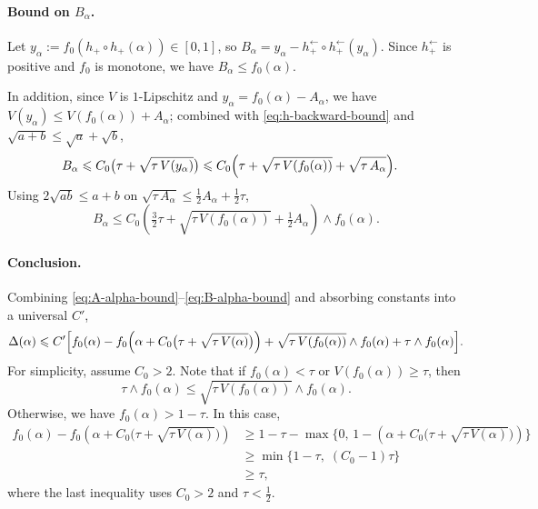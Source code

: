\documentclass[english]{article}
\theoremstyle{plain}
\theoremstyle{definition}
\newcommand{\hinv}{h_+^{\leftarrow}}
\newcommand{\hupup}{h_+\mathbin{\circ}h_+}                 %
\newcommand{\hinvinv}{h_+^{\leftarrow}\mathbin{\circ}h_+^{\leftarrow}}  %
\newcommand{\mgn}[1]{\tau+\sqrt{\tau\,V(#1)}}
\newcommand{\fnull}{f_0}
\begin{document}
\paragraph{Bound on $B_\alpha$.} Let $y_\alpha:=\fnull(\hupup(\alpha))\in[0,1]$, so $B_\alpha=y_\alpha-\hinvinv(y_\alpha)$. 
Since $\hinv$ is positive and $\fnull$ is monotone, we have $B_\alpha \leqslant \fnull(\alpha)$.

In addition, since $V$ is $1$-Lipschitz and $y_\alpha=\fnull(\alpha)-A_\alpha$, we have $V(y_\alpha)\leqslant V(\fnull(\alpha))+A_\alpha$; combined with \eqref{eq:h-backward-bound} and $\sqrt{a+b}\leqslant\sqrt a+\sqrt b$,
\begin{align*}
B_\alpha
&\leqslant C_0\bigl(\mgn{y_\alpha}\bigr)
\leqslant C_0\Bigl(\tau+\sqrt{\tau\,V(\fnull(\alpha))}+\sqrt{\tau\,A_\alpha}\Bigr).
\end{align*}
Using $2\sqrt{ab}\leqslant a+b$ on $\sqrt{\tau\,A_\alpha}\leqslant \tfrac12 A_\alpha+\tfrac12\tau$,
\begin{equation}
B_\alpha
\leqslant
C_0\left(\tfrac32\tau+\sqrt{\tau\,V(\fnull(\alpha))}+\tfrac12 A_\alpha\right) \wedge \fnull(\alpha).
\label{eq:B-alpha-bound}
\end{equation}

\paragraph{Conclusion.} Combining \eqref{eq:A-alpha-bound}--\eqref{eq:B-alpha-bound} and absorbing constants into a universal $C'$,
\[
\Delta(\alpha)
\leqslant
C'\Bigl[
\fnull(\alpha)-\fnull\!\left(\alpha+C_0\bigl(\mgn{\alpha}\bigr)\right)
+\sqrt{\tau\,V(\fnull(\alpha))} \wedge \fnull (\alpha)+\tau \wedge \fnull (\alpha)
\Bigr].
\]
For simplicity, assume $C_0 > 2$. Note that if $\fnull(\alpha) < \tau$ or $V(\fnull(\alpha)) \geqslant \tau$, then
\[
\tau \wedge \fnull(\alpha)
\leqslant
\sqrt{\tau\,V(\fnull(\alpha))} \wedge \fnull(\alpha).
\]
Otherwise, we have $\fnull(\alpha) > 1 - \tau$. In this case,
\begin{align*}
\fnull(\alpha) - \fnull\!\left(\alpha + C_0 \bigl(\mgn{\alpha}\bigr)\right)
&\geqslant 1 - \tau - \max\{0,\, 1 - (\alpha + C_0 \bigl(\mgn{\alpha}\bigr))\} \\
&\geqslant \min\{1 - \tau,\; (C_0 - 1)\tau\} \\
&\geqslant \tau,
\end{align*}
where the last inequality uses $C_0 > 2$ and $\tau < \tfrac{1}{2}$.
\end{document}
